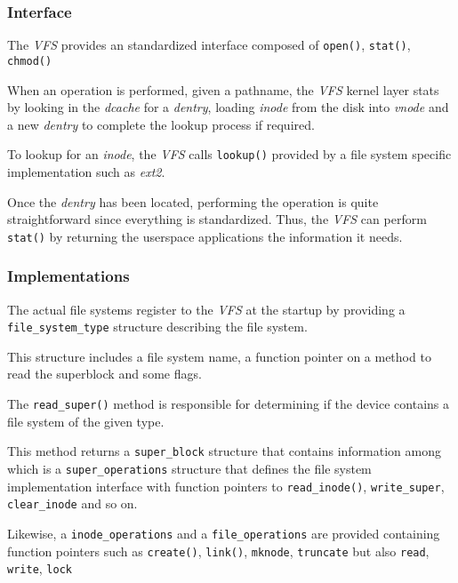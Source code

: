 \begin{frame}
  \frametitle{Interface}

  The \textit{VFS} provides an standardized interface composed of
  \texttt{open()}, \texttt{stat()}, \texttt{chmod()} \etc{}

  \-

  When an operation is performed, given a pathname, the \textit{VFS} kernel
  layer stats by looking in the \textit{dcache} for a \textit{dentry}, loading
  \textit{inode} from the disk into \textit{vnode} and a new \textit{dentry}
  to complete the lookup process if required.

  \-

  To lookup for an \textit{inode}, the \textit{VFS} calls \texttt{lookup()}
  provided by a file system specific implementation such as \textit{ext2}.

  \-

  Once the \textit{dentry} has been located, performing the operation is quite
  straightforward since everything is standardized. Thus, the \textit{VFS}
  can perform \texttt{stat()} by returning the userspace applications the
  information it needs.
\end{frame}


\begin{frame}
  \frametitle{Implementations}

  The actual file systems register to the \textit{VFS} at the startup by
  providing a \texttt{file\_system\_type} structure describing the file
  system.

  \-

  This structure includes a file system name, a function pointer on a
  method to read the superblock and some flags.

  \-

  The \texttt{read\_super()} method is responsible for determining if the
  device contains a file system of the given type.

  \-

  This method returns a \texttt{super\_block} structure that contains
  information among which is a \texttt{super\_operations} structure that
  defines the file system implementation interface with function pointers
  to \texttt{read\_inode()}, \texttt{write\_super}, \texttt{clear\_inode}
  and so on.

  \-

  Likewise, a \texttt{inode\_operations} and a \texttt{file\_operations} are
  provided containing function pointers such as \texttt{create()},
  \texttt{link()}, \texttt{mknode}, \texttt{truncate} but also \texttt{read},
  \texttt{write}, \texttt{lock} \etc{}
\end{frame}

